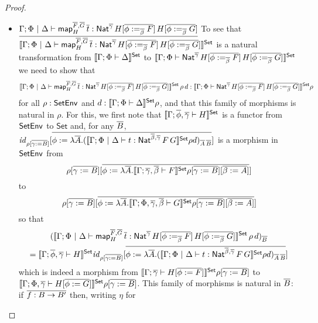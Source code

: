 \documentclass[acmsmall,review,anonymous]{acmart}
\theoremstyle{definition}
\newcommand{\set}{\mathsf{Set}}
\renewcommand{\id}{\mathit{id}}
\newcommand{\map}{\mathsf{map}}
\begin{document}
\begin{proof}
\begin{itemize}
\item 
  $\underline{\Gamma;\Phi~|~\Delta \vdash
  \map^{\ol{F},\ol{G}}_H\, \ol{t} :
  \Nat^{\ol{\gamma}}\,H[\ol{\phi :=_{\ol{\beta}} F}]\,H[\ol{\phi
      :=_{\ol{\beta}} G}]}$\;
  To see that
  $\setsem{\Gamma; \Phi~|~\Delta \vdash \map^{\ol{F},\ol{G}}_H\, \ol{t}
  : \Nat^{\ol{\gamma}}\,H[\ol{\phi :=_{\ol{\beta}} F}]\,H[\ol{\phi
      :=_{\ol{\beta}} G}]}$ is a natural transformation from
  $\setsem{\Gamma;\Phi \vdash \Delta}$ to
  $\setsem{\Gamma;\Phi \vdash \Nat^{\ol{\gamma}}\,H[\ol{\phi :=_{\ol{\beta}} F}]\,H[\ol{\phi
      :=_{\ol{\beta}} G}]}$ we need to show that
\[
\setsem{\Gamma; \Phi~|~\Delta \vdash \map^{\ol{F},\ol{G}}_H\, \ol{t}
    : \Nat^{\ol{\gamma}}\,H[\ol{\phi :=_{\ol{\beta}} F}]\,H[\ol{\phi
        :=_{\ol{\beta}} G}]}\,\rho\,d
  : \setsem{\Gamma; \Phi \vdash
    \Nat^{\ol{\gamma}}\,H[\ol{\phi :=_{\ol{\beta}} F}]\,H[\ol{\phi
        :=_{\ol{\beta}} G}]} \rho
\]
  for all $\rho : \mathsf{SetEnv}$ and $d : \setsem{\Gamma;\Phi \vdash \Delta} \rho$,
  and that this family of morphisms is natural in $\rho$.
  For this, we first note that
  $\setsem{\Gamma ;\ol{\phi}, \ol{\gamma} \vdash H}$ is a functor from
  $\mathsf{SetEnv}$ to $\set$ and, for any $\overline{B}$, $\id_{\rho[\ol{\gamma := B}]}
  [\ol{\phi := \lambda \ol{A}. {(\setsem{\Gamma; \Phi~|~\Delta \vdash t : \Nat^{\ol{\beta},\ol{\gamma}}\,F\,G} \rho d)}_{\ol{A}\,\ol{B}}}]$
  is a
  morphism in $\mathsf{SetEnv}$ from \[\rho[\ol{\gamma := B}][\ol{\phi :=
      \lambda \ol{A}.\setsem{\Gamma; \ol{\gamma},\ol{\beta} \vdash
        F}\rho[\ol{\gamma := B}][\ol{\beta := A}]}]\] to
  \[\rho[\ol{\gamma := B}][\ol{\phi := \lambda \ol{A}.\setsem{\Gamma;
        \Phi, \ol{\gamma},\ol{\beta} \vdash G}\rho[\ol{\gamma :=
          B}][\ol{\beta := A}]}]\]
so that
\begin{multline*}
(\setsem{\Gamma; \Phi~|~\Delta \vdash
\map^{\ol{F},\ol{G}}_H\, \ol{t} :
\Nat^{\ol{\gamma}}\,H[\ol{\phi :=_{\ol{\beta}} F}]\,H[\ol{\phi
    :=_{\ol{\beta}} G}]}\,\rho\,d)_{\ol{B}} \\
= \setsem{\Gamma; \ol{\phi},\ol{\gamma} \vdash H}\id_{\rho[\ol{\gamma := B}]}
[\ol{\phi := \lambda \ol{A}. {(\setsem{\Gamma; \Phi~|~\Delta \vdash t : \Nat^{\ol{\beta},\ol{\gamma}}\,F\,G} \rho d)}_{\ol{A}\,\ol{B}}}]
\end{multline*}
which is indeed a morphism from
$\setsem{\Gamma ;\ol{\gamma} \vdash H[\ol{\phi := F}]}\rho[\ol{\gamma := B}]$
to 
$\setsem{\Gamma ;\Phi, \ol{\gamma} \vdash H[\ol{\phi := G}]}\rho[\ol{\gamma := B}]$.
This family of morphisms is natural in $\overline{B}$: if $\overline{f : B \to B'}$
then, writing $\eta$ for

\end{itemize}
\end{proof}
\end{document}
